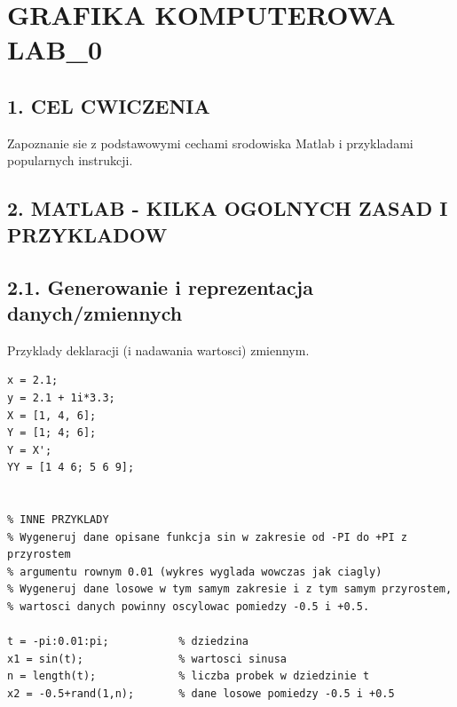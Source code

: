\documentclass[10pt]{article}
\begin{document}
{\Huge\section*{GRAFIKA KOMPUTEROWA LAB\_0}}

\tableofcontents
\vspace*{4em}



{}
\subsection*{1. CEL CWICZENIA}



Zapoznanie sie z podstawowymi cechami srodowiska Matlab i przykladami popularnych instrukcji.



{}
\subsection*{2.	MATLAB - KILKA OGOLNYCH ZASAD I PRZYKLADOW}



{}
\subsection*{2.1. Generowanie i reprezentacja danych/zmiennych}



Przyklady deklaracji (i nadawania wartosci) zmiennym.

\begin{lstlisting}
x = 2.1;
y = 2.1 + 1i*3.3;
X = [1, 4, 6];
Y = [1; 4; 6];
Y = X';
YY = [1 4 6; 5 6 9];


% INNE PRZYKLADY
% Wygeneruj dane opisane funkcja sin w zakresie od -PI do +PI z przyrostem
% argumentu rownym 0.01 (wykres wyglada wowczas jak ciagly)
% Wygeneruj dane losowe w tym samym zakresie i z tym samym przyrostem,
% wartosci danych powinny oscylowac pomiedzy -0.5 i +0.5.

t = -pi:0.01:pi;           % dziedzina
x1 = sin(t);               % wartosci sinusa
n = length(t);             % liczba probek w dziedzinie t
x2 = -0.5+rand(1,n);       % dane losowe pomiedzy -0.5 i +0.5
\end{lstlisting}
\end{document}
